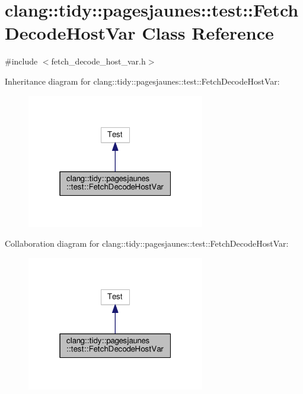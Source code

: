 \hypertarget{classclang_1_1tidy_1_1pagesjaunes_1_1test_1_1_fetch_decode_host_var}{}\section{clang\+:\+:tidy\+:\+:pagesjaunes\+:\+:test\+:\+:Fetch\+Decode\+Host\+Var Class Reference}
\label{classclang_1_1tidy_1_1pagesjaunes_1_1test_1_1_fetch_decode_host_var}


{\ttfamily \#include $<$fetch\+\_\+decode\+\_\+host\+\_\+var.\+h$>$}



Inheritance diagram for clang\+:\+:tidy\+:\+:pagesjaunes\+:\+:test\+:\+:Fetch\+Decode\+Host\+Var\+:
\nopagebreak
\begin{figure}[H]
\begin{center}
\leavevmode
\includegraphics[width=220pt]{classclang_1_1tidy_1_1pagesjaunes_1_1test_1_1_fetch_decode_host_var__inherit__graph}
\end{center}
\end{figure}


Collaboration diagram for clang\+:\+:tidy\+:\+:pagesjaunes\+:\+:test\+:\+:Fetch\+Decode\+Host\+Var\+:
\nopagebreak
\begin{figure}[H]
\begin{center}
\leavevmode
\includegraphics[width=220pt]{classclang_1_1tidy_1_1pagesjaunes_1_1test_1_1_fetch_decode_host_var__coll__graph}
\end{center}
\end{figure}
